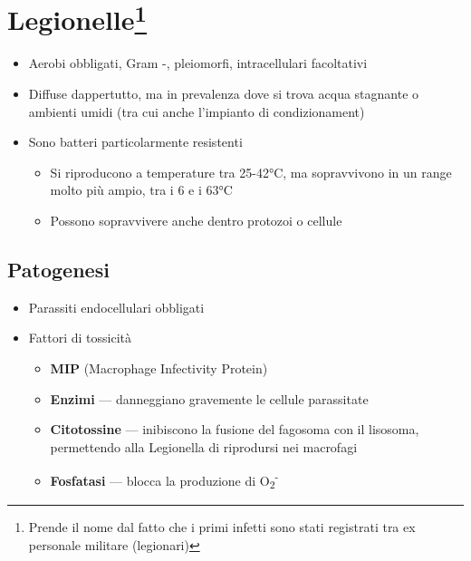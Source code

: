 \documentclass[italian,]{article}
\providecommand{\tightlist}{%
  \setlength{\itemsep}{0pt}\setlength{\parskip}{0pt}}
\begin{document}
\hypertarget{legionelle}{%
\section[Legionelle]{\texorpdfstring{Legionelle\footnote{Prende il nome
  dal fatto che i primi infetti sono stati registrati tra ex personale
  militare (legionari)}}{Legionelle}}\label{legionelle}}

\begin{itemize}
\tightlist
\item
  Aerobi obbligati, Gram -, pleiomorfi, intracellulari facoltativi
\item
  Diffuse dappertutto, ma in prevalenza dove si trova acqua stagnante o
  ambienti umidi (tra cui anche l'impianto di condizionament)
\item
  Sono batteri particolarmente resistenti

  \begin{itemize}
  \tightlist
  \item
    Si riproducono a temperature tra 25-42°C, ma sopravvivono in un
    range molto più ampio, tra i 6 e i 63°C
  \item
    Possono sopravvivere anche dentro protozoi o cellule
  \end{itemize}
\end{itemize}

\hypertarget{patogenesi-7}{%
\subsection{Patogenesi}\label{patogenesi-7}}

\begin{itemize}
\tightlist
\item
  Parassiti endocellulari obbligati
\item
  Fattori di tossicità

  \begin{itemize}
  \tightlist
  \item
    \textbf{MIP} (Macrophage Infectivity Protein)
  \item
    \textbf{Enzimi} --- danneggiano gravemente le cellule parassitate
  \item
    \textbf{Citotossine} --- inibiscono la fusione del fagosoma con il
    lisosoma, permettendo alla Legionella di riprodursi nei macrofagi
  \item
    \textbf{Fosfatasi} --- blocca la produzione di
    O\textsubscript{2}\textsuperscript{-}
  \end{itemize}
\end{itemize}
\end{document}

